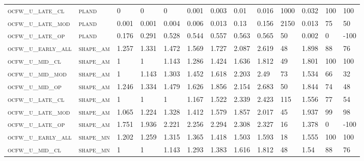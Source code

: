 \begin{landscape}
\begin{center}
\begin{footnotesize}
\begin{longtable}{lllllllllllll}
\textsc{ocfw\_u\_late\_cl  } & \textsc{pland     }   & 0        & 0        & 0        & 0.001    & 0.003    & 0.01     & 0.016     & 1000   & 0.032         & 100           & 100      \\
\textsc{ocfw\_u\_late\_mod } & \textsc{pland     }   & 0.001    & 0.001    & 0.004    & 0.006    & 0.013    & 0.13     & 0.156     & 2150   & 0.013         & 75            & 50       \\
\textsc{ocfw\_u\_late\_op  } & \textsc{pland     }   & 0.176    & 0.291    & 0.528    & 0.544    & 0.557    & 0.563    & 0.565     & 50     & 0.002         & 0             & -100     \\
\textsc{ocfw\_u\_early\_all} & \textsc{shape\_am }   & 1.257    & 1.331    & 1.472    & 1.569    & 1.727    & 2.087    & 2.619     & 48     & 1.898         & 88            & 76       \\
\textsc{ocfw\_u\_mid\_cl   } & \textsc{shape\_am }   & 1        & 1        & 1.143    & 1.286    & 1.424    & 1.636    & 1.812     & 49     & 1.801         & 100           & 100      \\
\textsc{ocfw\_u\_mid\_mod  } & \textsc{shape\_am }   & 1        & 1.143    & 1.303    & 1.452    & 1.618    & 2.203    & 2.49      & 73     & 1.534         & 66            & 32       \\
\textsc{ocfw\_u\_mid\_op   } & \textsc{shape\_am }   & 1.246    & 1.334    & 1.479    & 1.626    & 1.856    & 2.154    & 2.683     & 50     & 1.844         & 74            & 48       \\
\textsc{ocfw\_u\_late\_cl  } & \textsc{shape\_am }   & 1        & 1        & 1        & 1.167    & 1.522    & 2.339    & 2.423     & 115    & 1.556         & 77            & 54       \\
\textsc{ocfw\_u\_late\_mod } & \textsc{shape\_am }   & 1.065    & 1.224    & 1.328    & 1.412    & 1.579    & 1.857    & 2.017     & 45     & 1.937         & 99            & 98       \\
\textsc{ocfw\_u\_late\_op  } & \textsc{shape\_am }   & 1.751    & 1.936    & 2.221    & 2.256    & 2.294    & 2.308    & 2.327     & 16     & 1.378         & 0             & -100     \\
\textsc{ocfw\_u\_early\_all} & \textsc{shape\_mn }   & 1.202    & 1.259    & 1.315    & 1.365    & 1.418    & 1.503    & 1.593     & 18     & 1.555         & 100           & 100      \\
\textsc{ocfw\_u\_mid\_cl   } & \textsc{shape\_mn }   & 1        & 1        & 1.143    & 1.293    & 1.383    & 1.616    & 1.812     & 48     & 1.54          & 88            & 76       \\

\end{longtable}
\end{footnotesize}
\end{center}
\end{landscape}
